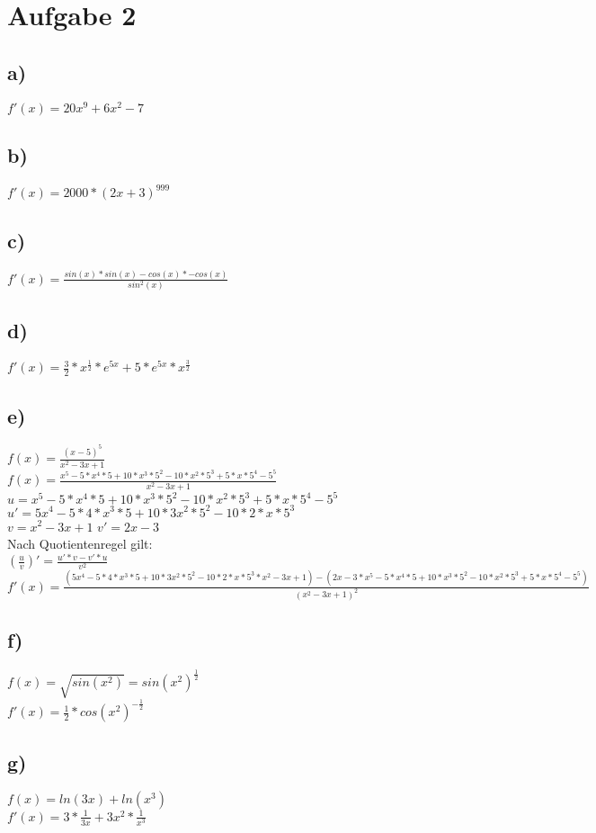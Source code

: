 \documentclass{article}
\begin{document}
	\section*{Aufgabe 2}
	\subsection*{a)}
	$f'(x) = 20x^9 + 6x^2 - 7$
	\subsection*{b)}
	$f'(x) = 2000*(2x + 3)^{999}$
	\subsection*{c)}
	$f'(x) =\frac{sin(x) * sin(x) - cos(x)*-cos(x)}{sin^2(x)}$
	\subsection*{d)}
	$f'(x) = \frac{3}{2}*x^{\frac{1}{2}} * e^{5x} + 5*e^{5x} *x^{\frac{3}{2}}$
	\subsection*{e)}
	$f(x)= \frac{(x-5)^5}{x^2 - 3x + 1}$ \\
	$f(x)= \frac{x^5 - 5*x^4*5 + 10 * x^3 * 5^2 - 10*x^2 * 5^3 + 5 *x*5^4 - 5^5}{x^2 - 3x + 1}$ \\
	$u =x^5 - 5*x^4*5 + 10 * x^3 * 5^2 - 10*x^2 * 5^3 + 5 *x*5^4 - 5^5$ \\
	$u' =5x^4 - 5*4*x^3*5 + 10 * 3x^2 * 5^2 - 10*2*x * 5^3$ \\
	$v = x^2 - 3x + 1$ $v' = 2x - 3$ \\
	Nach Quotientenregel gilt: \\
	$(\frac{u}{v})' = \frac{u' * v - v'*u}{v^2}$ \\
	$f'(x) = \frac{(5x^4 - 5*4*x^3*5 + 10 * 3x^2 * 5^2 - 10*2*x * 5^3 * x^2 - 3x + 1) - (2x - 3 * x^5 - 5*x^4*5 + 10 * x^3 * 5^2 - 10*x^2 * 5^3 + 5 *x*5^4 - 5^5)}{(x^2 - 3x + 1)^2}$
	\subsection*{f)}
	$f(x) = \sqrt{sin(x^2)} = sin(x^2)^\frac{1}{2}$ \\
	$f'(x) = \frac{1}{2}*cos(x^2)^{-\frac{1}{2}}$
	\subsection*{g)}
	$f(x) = ln(3x) + ln(x^3)$ \\
	$f'(x) = 3 * \frac{1}{3x} + 3x^2 * \frac{1}{x^3}$
\end{document}
